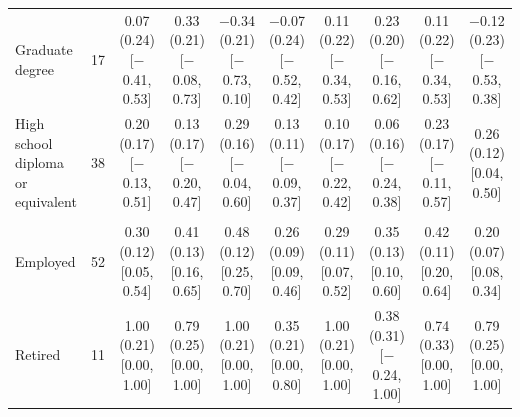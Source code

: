 \begin{table}[t]
\begin{tabular}{@{}lr*{8}{c}@{}}
\quad Graduate degree & 17 & \makecell{0.07 (0.24)\\ {[}$-$0.41, 0.53{]}} & \makecell{0.33 (0.21)\\ {[}$-$0.08, 0.73{]}} & \makecell{$-$0.34 (0.21)\\ {[}$-$0.73, 0.10{]}} & \makecell{$-$0.07 (0.24)\\ {[}$-$0.52, 0.42{]}} & \makecell{0.11 (0.22)\\ {[}$-$0.34, 0.53{]}} & \makecell{0.23 (0.20)\\ {[}$-$0.16, 0.62{]}} & \makecell{0.11 (0.22)\\ {[}$-$0.34, 0.53{]}} & \makecell{$-$0.12 (0.23)\\ {[}$-$0.53, 0.38{]}} \\
\quad High school diploma or equivalent & 38 & \makecell{0.20 (0.17)\\ {[}$-$0.13, 0.51{]}} & \makecell{0.13 (0.17)\\ {[}$-$0.20, 0.47{]}} & \makecell{0.29 (0.16)\\ {[}$-$0.04, 0.60{]}} & \makecell{0.13 (0.11)\\ {[}$-$0.09, 0.37{]}} & \makecell{0.10 (0.17)\\ {[}$-$0.22, 0.42{]}} & \makecell{0.06 (0.16)\\ {[}$-$0.24, 0.38{]}} & \makecell{0.23 (0.17)\\ {[}$-$0.11, 0.57{]}} & \makecell{0.26 (0.12)\\ {[}0.04, 0.50{]}} \\
\addlinespace
\multicolumn{10}{@{}l}{\textit{Occupation (N)}} \\
\quad Employed & 52 & \makecell{0.30 (0.12)\\ {[}0.05, 0.54{]}} & \makecell{0.41 (0.13)\\ {[}0.16, 0.65{]}} & \makecell{0.48 (0.12)\\ {[}0.25, 0.70{]}} & \makecell{0.26 (0.09)\\ {[}0.09, 0.46{]}} & \makecell{0.29 (0.11)\\ {[}0.07, 0.52{]}} & \makecell{0.35 (0.13)\\ {[}0.10, 0.60{]}} & \makecell{0.42 (0.11)\\ {[}0.20, 0.64{]}} & \makecell{0.20 (0.07)\\ {[}0.08, 0.34{]}} \\
\quad Retired & 11 & \makecell{1.00 (0.21)\\ {[}0.00, 1.00{]}} & \makecell{0.79 (0.25)\\ {[}0.00, 1.00{]}} & \makecell{1.00 (0.21)\\ {[}0.00, 1.00{]}} & \makecell{0.35 (0.21)\\ {[}0.00, 0.80{]}} & \makecell{1.00 (0.21)\\ {[}0.00, 1.00{]}} & \makecell{0.38 (0.31)\\ {[}$-$0.24, 1.00{]}} & \makecell{0.74 (0.33)\\ {[}0.00, 1.00{]}} & \makecell{0.79 (0.25)\\ {[}0.00, 1.00{]}} \\

\end{tabular}
\end{table}
